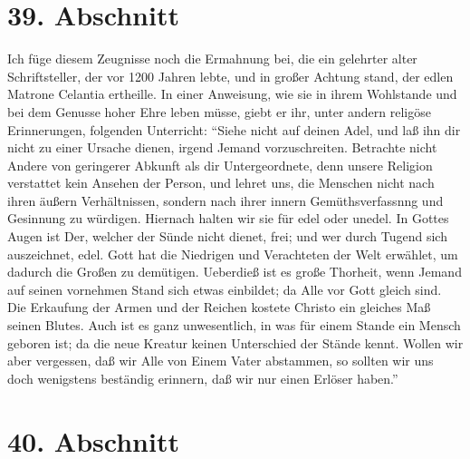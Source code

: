\section{39. Abschnitt} \label{kap9_ab39}

Ich füge diesem Zeugnisse noch die Ermahnung bei, die ein gelehrter alter
Schriftsteller, der vor 1200 Jahren lebte, und in großer Achtung stand, der
edlen Matrone Celantia ertheille. In einer Anweisung, wie sie in ihrem
Wohlstande und bei dem Genusse hoher Ehre leben müsse, giebt er ihr, unter
andern religöse Erinnerungen, folgenden Unterricht: "`Siehe nicht auf deinen
Adel, und laß ihn dir nicht zu einer Ursache dienen, irgend Jemand
vorzuschreiten. Betrachte nicht Andere von geringerer Abkunft als dir
Untergeordnete, denn unsere Religion verstattet kein Ansehen der Person, und
lehret uns, die Menschen nicht nach ihren äußern Verhältnissen, sondern nach
ihrer innern Gemüthsverfassnng und Gesinnung zu würdigen. Hiernach halten wir
sie für edel oder unedel. In Gottes Augen ist Der, welcher der Sünde nicht
dienet, frei; und wer durch Tugend sich auszeichnet, edel. Gott hat die
Niedrigen und Verachteten der Welt erwählet, um dadurch die Großen zu demütigen.
Ueberdieß ist es große Thorheit, wenn Jemand auf seinen vornehmen Stand sich
etwas einbildet; da Alle vor Gott gleich sind. Die Erkaufung der Armen und der
Reichen kostete Christo ein gleiches Maß seinen Blutes. Auch ist es ganz
unwesentlich, in was für einem Stande ein Mensch geboren ist; da die neue
Kreatur keinen Unterschied der Stände kennt. Wollen wir aber vergessen, daß wir
Alle von Einem Vater abstammen, so sollten wir uns doch wenigstens beständig
erinnern, daß wir nur einen Erlöser haben."'

\section{40. Abschnitt} \label{kap9_ab40}

